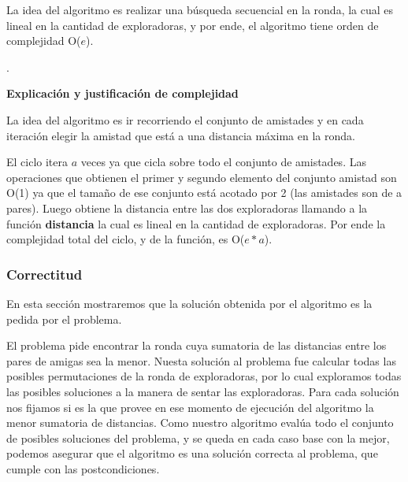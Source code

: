 \documentclass[11pt]{article}
\begin{document}
La idea del algoritmo es realizar una búsqueda secuencial en la ronda, la cual es lineal en la cantidad de 
exploradoras, y por ende, el algoritmo tiene orden de complejidad O($e$).

\noindent\makebox[\linewidth]{\rule{17cm}{0.4pt}}
.\\

\vspace{3mm}
\begin{center}
\textbf{Explicación y justificación de complejidad} \\ 
\end{center} 

La idea del algoritmo es ir recorriendo el conjunto de amistades y en cada iteración elegir la amistad que está   
a una distancia máxima en la ronda.

El ciclo itera $a$ veces ya que cicla sobre todo el conjunto de amistades. Las operaciones que obtienen el 
primer y segundo elemento del conjunto amistad son O(1) ya que el tamaño de ese conjunto está acotado por 
2 (las amistades son de a pares). Luego obtiene la distancia entre las dos exploradoras llamando a la 
función \textbf{distancia} la cual es lineal en la cantidad de exploradoras. Por ende la complejidad
total del ciclo, y de la función, es O($e*a$). 

\subsubsection{Correctitud}

En esta sección mostraremos que la solución obtenida por el algoritmo es la pedida por el problema. 

El problema pide encontrar la ronda cuya sumatoria de las distancias entre los pares de amigas sea la menor.
Nuesta solución al problema fue calcular todas las posibles permutaciones de la ronda de exploradoras, por lo cual 
exploramos todas las posibles soluciones a la manera de sentar las exploradoras. Para cada solución nos fijamos 
si es la que provee en ese momento de ejecución del algoritmo la menor sumatoria de distancias. Como nuestro 
algoritmo evalúa todo el conjunto de posibles soluciones del problema, y se queda en cada caso base con la mejor,
podemos asegurar que el algoritmo es una solución correcta al problema, que cumple con las postcondiciones.
\end{document}
